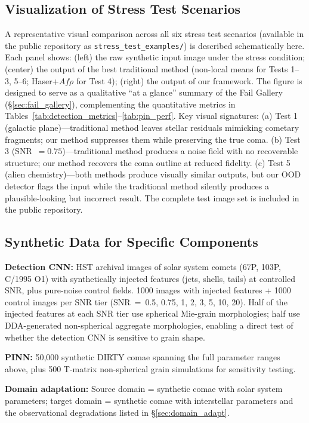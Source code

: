 \documentclass[preprint2]{aastex631}
\begin{document}
\subsection{Visualization of Stress Test Scenarios}

A representative visual comparison across all six stress test scenarios (available in the public repository as \texttt{stress\_test\_examples/}) is described schematically here. Each panel shows: (left) the raw synthetic input image under the stress condition; (center) the output of the best traditional method (non-local means for Tests 1--3, 5--6; Haser+$Af\rho$ for Test 4); (right) the output of our framework. The figure is designed to serve as a qualitative ``at a glance'' summary of the Fail Gallery (\S\ref{sec:fail_gallery}), complementing the quantitative metrics in Tables~\ref{tab:detection_metrics}--\ref{tab:pin_perf}. Key visual signatures: (a) Test 1 (galactic plane)---traditional method leaves stellar residuals mimicking cometary fragments; our method suppresses them while preserving the true coma. (b) Test 3 (SNR~$=0.75$)---traditional method produces a noise field with no recoverable structure; our method recovers the coma outline at reduced fidelity. (c) Test 5 (alien chemistry)---both methods produce visually similar outputs, but our OOD detector flags the input while the traditional method silently produces a plausible-looking but incorrect result. The complete test image set is included in the public repository.

\subsection{Synthetic Data for Specific Components}

\textbf{Detection CNN:} HST archival images of solar system comets (67P, 103P, C/1995 O1) with synthetically injected features (jets, shells, tails) at controlled SNR, plus pure-noise control fields. 1000 images with injected features + 1000 control images per SNR tier (SNR~=~0.5, 0.75, 1, 2, 3, 5, 10, 20). Half of the injected features at each SNR tier use spherical Mie-grain morphologies; half use DDA-generated non-spherical aggregate morphologies, enabling a direct test of whether the detection CNN is sensitive to grain shape.

\textbf{PINN:} 50,000 synthetic DIRTY comae spanning the full parameter ranges above, plus 500 T-matrix non-spherical grain simulations for sensitivity testing.

\textbf{Domain adaptation:} Source domain = synthetic comae with solar system parameters; target domain = synthetic comae with interstellar parameters and the observational degradations listed in \S\ref{sec:domain_adapt}.
\end{document}
